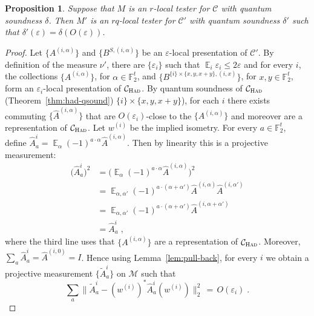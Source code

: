 \documentclass[11pt]{article}
\newtheorem{proposition}[theorem]{Proposition}
\theoremstyle{definition}
\newcommand{\code}{\mathcal{C}}
\newcommand{\Id}{\ensuremath{I}}
\DeclareMathOperator*{\Expectation}{\mathbb{E}}
\newcommand{\Es}[1]{\Expectation_{#1}}
\newcommand{\F}{\ensuremath{\mathbb{F}}}
\newcommand{\cM}{\ensuremath{\mathcal{M}}}
\newcommand{\Had}{\ensuremath{\textsc{Had}}}
\newcommand{\eps}{\varepsilon}
\begin{document}
\begin{proposition}\label{prop:q-to-2}
Suppose that $M$ is an $r$-local tester for $\code$ with quantum soundness $\delta$. Then $M'$ is an $rq$-local tester for $\code'$ with quantum soundness $\delta'$ such that $\delta'(\eps)=\delta(O(\eps))$. 
\end{proposition}

\begin{proof}
Let $\{A^{(i,\alpha)}\}$ and $\{B^{S,(i,\alpha)}\}$ be an $\eps$-local presentation of $\code'$. By definition of the measure $\nu'$, there are $\{\eps_i\}$ such that $\Es{i} \eps_i \leq 2\eps$ and for every $i$, the collections $\{A^{(i,\alpha)}\}$, for $\alpha \in \F_2^t$, and $\{B^{\{i\}\times \{x,y,x+y\},(i,x)}\}$, for $x,y\in\F_2^t$, form an $\eps_i$-local presentation of $\code_\Had$. By quantum soundness of $\code_\Had$ (Theorem~\ref{thm:had-qsound}) $\{i\}\times\{x,y,x+y\}$), for each $i$ there exists commuting $\{\hat{A}^{(i,\alpha)}\}$ that are $O(\eps_i)$-close to the $\{A^{(i,\alpha)}\}$ and moreover are a representation of $\code_{\Had}$. Let $w^{(i)}$ be the implied isometry. For every $a\in \F_2^t$, define $\hat{A}^{i}_{a}=\Es{\alpha}(-1)^{a\cdot \alpha} \hat{A}^{(i,\alpha)}$. Then by linearity this is a projective measurement:
\begin{align*}
\big(\hat{A}^{i}_{a}\big)^2 &=\Big(\Es{\alpha}(-1)^{a\cdot \alpha} \hat{A}^{(i,\alpha)}\Big)^2\\
&= \Es{\alpha,\alpha' }(-1)^{a\cdot (\alpha+\alpha')} \hat{A}^{(i,\alpha)}\hat{A}^{(i,\alpha')}\\
&=\Es{\alpha,\alpha' }(-1)^{a\cdot (\alpha+\alpha')} \hat{A}^{(i,\alpha+\alpha')}\\
&=\hat{A}^{i}_{a}\;,
\end{align*}
where the third line uses that  $\{A^{(i,\alpha)}\}$ are a representation of $\code_{\Had}$. Moreover, $\sum_a \hat{A}^{i}_{a} = \hat{A}^{(i,0)}=\Id$. Hence using Lemma~\ref{lem:pull-back}, for every $i$ we obtain a projective measurement $\{\tilde{A}^{i}_{a}\}$ on $\cM$ such that
\begin{equation}\label{eq:qto2-1a}
 \sum_a \big\| \tilde{A}^i_a - (w^{(i)})^* \hat{A}^i_a (w^{(i)}) \big\|_2^2 \,=\, O(\eps_i)\;.
\end{equation}

\end{proof}
\end{document}
